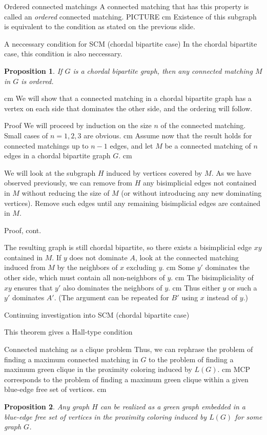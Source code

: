 \documentclass{beamer}
\newtheorem{prop}{Proposition}
\newcommand{\bframe}[2]{\begin{frame}{#1}#2\end{frame}}
\begin{document}
\bframe{Ordered connected matchings}{
A connected matching that has this property is called an {\it ordered } connected matching. PICTURE\pause\vskip 0.5 cm
Existence of this subgraph is equivalent to the condition as stated on the previous slide.
}

\bframe{A neccessary condition for SCM (chordal bipartite case)}{
In the chordal bipartite case, this condition is also neccessary.
\begin{prop}
	If $G$ is a chordal bipartite graph, then any connected matching $M$ in $G$ is ordered.
\end{prop}\pause\vskip 0.5 cm  
	We will show that a connected matching in a chordal bipartite graph has a vertex on each side that dominates the other side, and the ordering will follow.
}
\bframe{Proof}
{
 	We will proceed by induction on the size $n$ of the connected matching. \pause Small cases of $n = 1,2,3$ are obvious.  \pause \vskip 0.5 cm
	Assume now that the result holds for connected matchings up to $n-1$ edges, and let $M$ be a connected matching of $n$ edges in a chordal bipartite graph $G$.\pause \vskip 0.5 cm 

We will look at the subgraph $H$  induced by vertices covered by $M$.  \pause As we have observed previously, we can remove from $H$ any bisimplicial edges not contained in $M$ without reducing the size of $M$ \pause(or without introducing any new dominating vertices).  \pause  Remove such edges until any remaining bisimplicial edges are contained in $M$.
}

\bframe{Proof, cont.}{

The resulting graph is still chordal bipartite, so there exists a bisimplicial edge $xy$ contained in $M$. \pause If $y$ does not dominate $A$, look at the connected matching induced from $M$ by the neighbors of $x$ excluding $y$.  \pause \vskip 0.5 cm
Some $y'$ dominates the other side, which must contain all non-neighbors of $y$. \pause \vskip 0.5 cm The bisimpliciality of $xy$ ensures that $y'$ also dominates the neighbors of $y$.  \pause \vskip 0.5 cm Thus either $y$ or such a $y'$ dominates $A'$.  \pause (The argument can be repeated for $B'$ using $x$ instead of $y$.)  

}

\bframe{Continuing investigation into SCM (chordal bipartite case)}{

This theorem gives a Hall-type condition  

}



\bframe{Connected matching as a clique problem}{
	Thus, we can rephrase the problem of finding a maximum connected matching in $G$ to the problem of finding a maximum green clique in the proximity coloring induced by $L(G)$.\pause\vskip 0.5 cm
	MCP corresponds to the problem of finding a maximum green clique within a given blue-edge free set of vertices.\pause\vskip 0.5 cm
	\begin{prop}
		Any graph $H$ can be realized as a green graph embedded in a blue-edge free set of vertices in the proximity coloring induced by $L(G)$ for some graph $G$. 
	\end{prop}}
	
\end{document}
